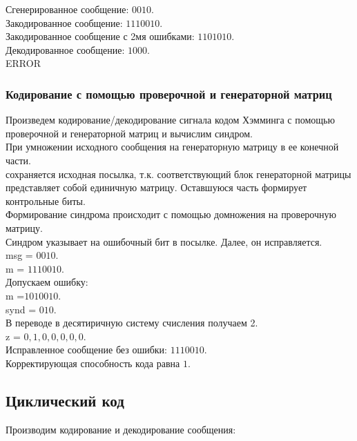 \documentclass[a4paper]{article}
\begin{document}
Сгенерированное сообщение:
$0 0 1 0$.\\
Закодированное сообщение:
$ 1 1 1 0 0 1 0$.\\
Закодированное сообщение с 2мя ошибками:
$1 1 0 1 0 1 0$.\\
Декодированное сообщение:
$1 0 0 0$.\\
ERROR \\
\subsubsection{Кодирование с помощью проверочной и генераторной матриц}
Произведем кодирование/декодирование сигнала кодом Хэмминга с помощью проверочной и генераторной матриц и вычислим синдром.\\
При умножении исходного сообщения на генераторную матрицу в ее конечной части.\\
сохраняется исходная посылка, т.к. соответствующий блок генераторной матрицы представляет собой единичную матрицу. Оставшуюся часть формирует контрольные биты.\\
Формирование синдрома происходит с помощью домножения на проверочную матрицу.\\
Синдром указывает на ошибочный бит в посылке. Далее, он исправляется.
\\

msg = $0 0 1 0$.\\
m = $1 1 1 0 0 1 0$.\\
Допускаем ошибку: \\
m =$1 0 1 0 0 1 0$.\\
synd = $0 1 0$.\\
В переводе в десятиричную систему счисления получаем 2.\\
z = $0, 1, 0, 0, 0, 0, 0$.\\
Исправленное сообщение без ошибки:
$1 1 1 0 0 1 0$.\\
Корректирующая способность кода равна $1$.
\subsection{Циклический код}
Производим кодирование и декодирование сообщения:
\\
\end{document}

